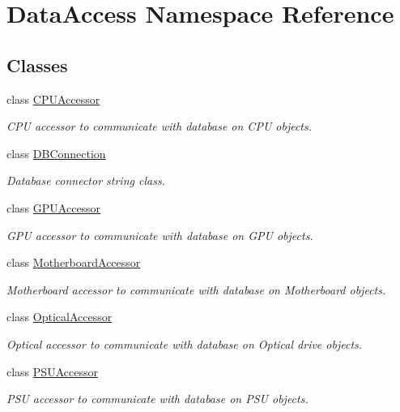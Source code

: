 \hypertarget{namespace_data_access}{}\section{Data\+Access Namespace Reference}
\label{namespace_data_access}
\subsection*{Classes}
\begin{DoxyCompactItemize}
\item 
class \hyperlink{class_data_access_1_1_c_p_u_accessor}{C\+P\+U\+Accessor}
\begin{DoxyCompactList}\small\item\em C\+PU accessor to communicate with database on C\+PU objects. \end{DoxyCompactList}\item 
class \hyperlink{class_data_access_1_1_d_b_connection}{D\+B\+Connection}
\begin{DoxyCompactList}\small\item\em Database connector string class. \end{DoxyCompactList}\item 
class \hyperlink{class_data_access_1_1_g_p_u_accessor}{G\+P\+U\+Accessor}
\begin{DoxyCompactList}\small\item\em G\+PU accessor to communicate with database on G\+PU objects. \end{DoxyCompactList}\item 
class \hyperlink{class_data_access_1_1_motherboard_accessor}{Motherboard\+Accessor}
\begin{DoxyCompactList}\small\item\em Motherboard accessor to communicate with database on Motherboard objects. \end{DoxyCompactList}\item 
class \hyperlink{class_data_access_1_1_optical_accessor}{Optical\+Accessor}
\begin{DoxyCompactList}\small\item\em Optical accessor to communicate with database on Optical drive objects. \end{DoxyCompactList}\item 
class \hyperlink{class_data_access_1_1_p_s_u_accessor}{P\+S\+U\+Accessor}
\begin{DoxyCompactList}\small\item\em P\+SU accessor to communicate with database on P\+SU objects. \end{DoxyCompactList}\item 

\end{DoxyCompactItemize}
